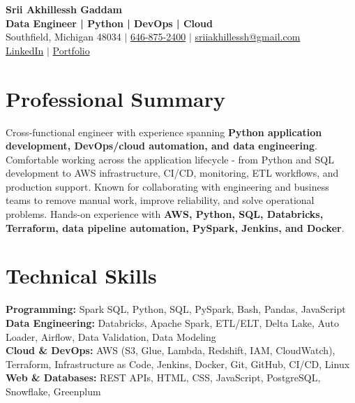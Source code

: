 \documentclass[letterpaper,10pt]{article}
\begin{document}
\fontsize{9.35pt}{10.45pt}\selectfont

\begin{center}
    {\LARGE \textbf{Srii Akhillessh Gaddam}} \\[-1pt]
    \textbf{Data Engineer | Python | DevOps | Cloud} \\[2pt]
    Southfield, Michigan 48034 $|$
    \href{tel:6468752400}{646-875-2400} $|$
    \href{mailto:sriiakhillessh@gmail.com}{sriiakhillessh@gmail.com} \\[1pt]
    \href{https://www.linkedin.com/in/srii-akhiilessh-gaddam-b48668191/}{LinkedIn} $|$
    \href{https://sriiakhillesshg.github.io/portfolio/}{Portfolio}
\end{center}
\vspace{-8pt}

\section{Professional Summary}
\small{Cross-functional engineer with experience spanning \textbf{Python application development, DevOps/cloud automation, and data engineering}. Comfortable working across the application lifecycle - from Python and SQL development to AWS infrastructure, CI/CD, monitoring, ETL workflows, and production support. Known for collaborating with engineering and business teams to remove manual work, improve reliability, and solve operational problems. Hands-on experience with \textbf{AWS, Python, SQL, Databricks, Terraform, data pipeline automation, PySpark, Jenkins, and Docker}.}

\section{Technical Skills}
\small{
\textbf{Programming:} Spark SQL, Python, SQL, PySpark, Bash, Pandas, JavaScript \\
\textbf{Data Engineering:} Databricks, Apache Spark, ETL/ELT, Delta Lake, Auto Loader, Airflow, Data Validation, Data Modeling \\
\textbf{Cloud \& DevOps:} AWS (S3, Glue, Lambda, Redshift, IAM, CloudWatch), Terraform, Infrastructure as Code, Jenkins, Docker, Git, GitHub, CI/CD, Linux \\
\textbf{Web \& Databases:} REST APIs, HTML, CSS, JavaScript, PostgreSQL, Snowflake, Greenplum
}
\end{document}
